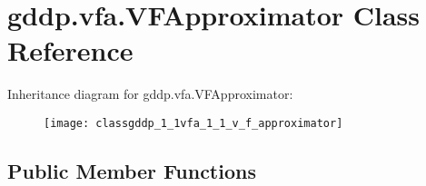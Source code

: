 \hypertarget{classgddp_1_1vfa_1_1_v_f_approximator}{}\section{gddp.\+vfa.\+V\+F\+Approximator Class Reference}
\label{classgddp_1_1vfa_1_1_v_f_approximator}
Inheritance diagram for gddp.\+vfa.\+V\+F\+Approximator\+:\begin{figure}[H]
\begin{center}
\leavevmode
\texttt{[image: classgddp\_1\_1vfa\_1\_1\_v\_f\_approximator]}
\end{center}
\end{figure}
\subsection*{Public Member Functions}
